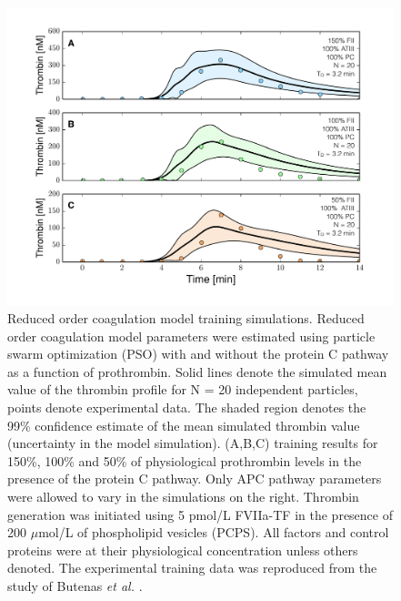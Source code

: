 \documentclass[12pt]{article}
\begin{document}
\begin{figure}
\centering
\includegraphics[width=1.0\textwidth]{./figs/Figure-4-DIFF_FII_APC.pdf}
\caption{Reduced order coagulation model training simulations.
Reduced order coagulation model parameters were estimated using particle swarm optimization (PSO) with and without the protein C pathway as a function of prothrombin. 
Solid lines denote the simulated mean value of the thrombin profile for N = 20 independent particles, points denote experimental data.
The shaded region denotes the 99\% confidence estimate of the mean simulated thrombin value (uncertainty in the model simulation).
(A,B,C) training results for 150\%, 100\% and 50\% of physiological prothrombin levels in the presence of the protein C pathway. 
Only APC pathway parameters were allowed to vary in the simulations on the right.
Thrombin generation was initiated using 5 pmol/L FVIIa-TF in the presence of 200 $\mu$mol/L of phospholipid vesicles (PCPS). 
All factors and control proteins were at their physiological concentration unless others denoted.
The experimental training data was reproduced from the study of Butenas \textit{et al.} \citep{Butenas:1999aa}.}\label{fig-diff_fII_APC}
\end{figure}

\clearpage
\end{document}
